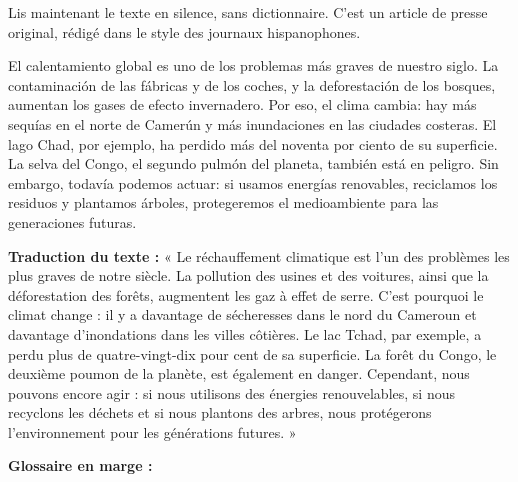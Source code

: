 \documentclass[11pt]{article}
\begin{document}
Lis maintenant le texte en silence, sans dictionnaire. C'est un article de presse original, rédigé dans le style des journaux hispanophones.

\begin{textebox}
El calentamiento global es uno de los problemas más graves de nuestro siglo. La contaminación de las fábricas y de los coches, y la deforestación de los bosques, aumentan los gases de efecto invernadero. Por eso, el clima cambia: hay más sequías en el norte de Camerún y más inundaciones en las ciudades costeras. El lago Chad, por ejemplo, ha perdido más del noventa por ciento de su superficie. La selva del Congo, el segundo pulmón del planeta, también está en peligro. Sin embargo, todavía podemos actuar: si usamos energías renovables, reciclamos los residuos y plantamos árboles, protegeremos el medioambiente para las generaciones futuras.
\end{textebox}

\textbf{Traduction du texte :} « Le réchauffement climatique est l'un des problèmes les plus graves de notre siècle. La pollution des usines et des voitures, ainsi que la déforestation des forêts, augmentent les gaz à effet de serre. C'est pourquoi le climat change : il y a davantage de sécheresses dans le nord du Cameroun et davantage d'inondations dans les villes côtières. Le lac Tchad, par exemple, a perdu plus de quatre-vingt-dix pour cent de sa superficie. La forêt du Congo, le deuxième poumon de la planète, est également en danger. Cependant, nous pouvons encore agir : si nous utilisons des énergies renouvelables, si nous recyclons les déchets et si nous plantons des arbres, nous protégerons l'environnement pour les générations futures. »

\textbf{Glossaire en marge :}
\end{document}
